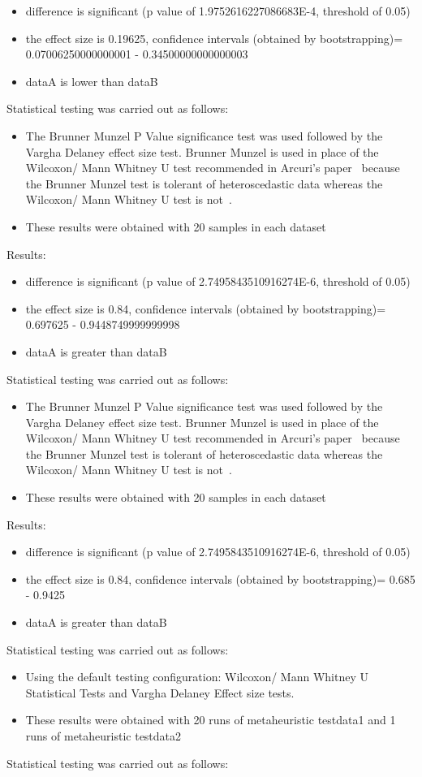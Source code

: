 \documentclass[]{article}
\begin{document}
\begin{itemize}
\item{difference is significant (p value of 1.9752616227086683E-4, threshold of 0.05)}
\item{the effect size is 0.19625, confidence intervals (obtained by bootstrapping)= 0.07006250000000001 - 0.34500000000000003}
\item{dataA is lower than dataB}
\end{itemize}Statistical testing was carried out as follows: \begin{itemize}
\item{The Brunner Munzel P Value significance test was used followed by the Vargha Delaney effect size test. Brunner Munzel is used in place of the  Wilcoxon/ Mann Whitney U test recommended in Arcuri's paper~\cite{Arcuri2012} because the Brunner Munzel test is tolerant of heteroscedastic data whereas the Wilcoxon/ Mann Whitney U test is not~\cite{Brunner2000}.}
\item{These results were obtained with 20 samples in each dataset}
\end{itemize}Results:
\begin{itemize}
\item{difference is significant (p value of 2.7495843510916274E-6, threshold of 0.05)}
\item{the effect size is 0.84, confidence intervals (obtained by bootstrapping)= 0.697625 - 0.9448749999999998}
\item{dataA is greater than dataB}
\end{itemize}Statistical testing was carried out as follows: \begin{itemize}
\item{The Brunner Munzel P Value significance test was used followed by the Vargha Delaney effect size test. Brunner Munzel is used in place of the  Wilcoxon/ Mann Whitney U test recommended in Arcuri's paper~\cite{Arcuri2012} because the Brunner Munzel test is tolerant of heteroscedastic data whereas the Wilcoxon/ Mann Whitney U test is not~\cite{Brunner2000}.}
\item{These results were obtained with 20 samples in each dataset}
\end{itemize}Results:
\begin{itemize}
\item{difference is significant (p value of 2.7495843510916274E-6, threshold of 0.05)}
\item{the effect size is 0.84, confidence intervals (obtained by bootstrapping)= 0.685 - 0.9425}
\item{dataA is greater than dataB}
\end{itemize}Statistical testing was carried out as follows: \begin{itemize}
\item{Using the default testing configuration: Wilcoxon/ Mann Whitney U Statistical Tests and Vargha Delaney Effect size tests.}
\item{These results were obtained with 20 runs of metaheuristic testdata1 and 1 runs of metaheuristic testdata2}
\end{itemize}Statistical testing was carried out as follows: 
\end{document}
